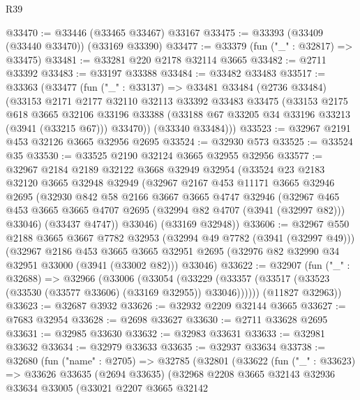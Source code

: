\begin{lexlean}{R39}
\begin{coremodule}
@33470 := @33446 (@33465 @33467) @33167
@33475 := @33393 (@33409 (@33440 @33470)) (@33169 @33390)
@33477 := @33379 (fun ("_" : @32817) => @33475)
@33481 := @33281 @220 @2178 @32114 @3665
@33482 := @2711 @33392
@33483 := @33197 @33388
@33484 := @33482 @33483
@33517 := @33363
    (@33477
      (fun ("_" : @33137) =>
      @33481
        @33484
        (@2736 @33484)
        (@33153
          @2171
          @2177
          @32110
          @32113
          @33392
          @33483
          @33475
          (@33153
            @2175
            @618
            @3665
            @32106
            @33196
            @33388
            (@33188 @67 @33205 @34 @33196 @33213 (@3941 (@33215 @67)))
            @33470))
        (@33340 @33484)))
@33523 := @32967 @2191 @453 @32126 @3665 @32956 @2695
@33524 := @32930 @573
@33525 := @33524 @35
@33530 := @33525 @2190 @32124 @3665 @32955 @32956
@33577 := @32967
    @2184
    @2189
    @32122
    @3668
    @32949
    @32954
    (@33524
      @23
      @2183
      @32120
      @3665
      @32948
      @32949
      (@32967
        @2167
        @453
        @11171
        @3665
        @32946
        @2695
        (@32930
          @842
          @58
          @2166
          @3667
          @3665
          @4747
          @32946
          (@32967 @465 @453 @3665 @3665 @4707 @2695 (@32994 @82 @4707 (@3941 (@32997 @82))) @33046)
          (@33437 @4747))
        @33046)
      (@33169 @32948))
@33606 := @32967
    @550
    @2188
    @3665
    @3667
    @7782
    @32953
    (@32994 @49 @7782 (@3941 (@32997 @49)))
    (@32967
      @2186
      @453
      @3665
      @3665
      @32951
      @2695
      (@32976 @82 @32990 @34 @32951 @33000 (@3941 (@33002 @82)))
      @33046)
@33622 := @32907
    (fun ("_" : @32688) =>
    @32966
      (@33006
        (@33054
          (@33229 (@33357 (@33517 (@33523 (@33530 (@33577 @33606) (@33169 @32955)) @33046))))))
      (@11827 @32963))
@33623 := @32687 @3932
@33626 := @32932 @2209 @32144 @3665
@33627 := @7683 @32954
@33628 := @2698 @33627
@33630 := @2711 @33628 @2695
@33631 := @32985 @33630
@33632 := @32983 @33631
@33633 := @32981 @33632
@33634 := @32979 @33633
@33635 := @32937 @33634
@33738 := @32680
    (fun ("name" : @2705) =>
    @32785
      (@32801
        (@33622
          (fun ("_" : @33623) =>
          @33626
            @33635
            (@2694 @33635)
            (@32968
              @2208
              @3665
              @32143
              @32936
              @33634
              @33005
              (@33021
                @2207
                @3665
                @32142

\end{coremodule}
\end{lexlean}
